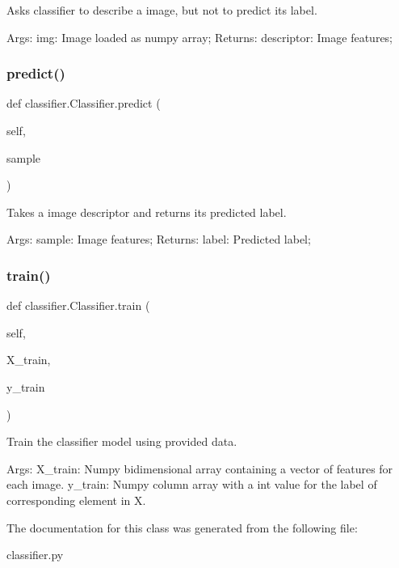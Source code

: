 Asks classifier to describe a image, but not to predict it\textquotesingle{}s label. 

Args\+: img\+: Image loaded as numpy array; Returns\+: descriptor\+: Image features; \mbox{\label{classclassifier_1_1_classifier_aec9c4f80b858660a2ac85226e56670a1}} 
\subsubsection{\texorpdfstring{predict()}{predict()}}
{\footnotesize\ttfamily def classifier.\+Classifier.\+predict (\begin{DoxyParamCaption}\item[{}]{self,  }\item[{}]{sample }\end{DoxyParamCaption})}



Takes a image descriptor and returns it\textquotesingle{}s predicted label. 

Args\+: sample\+: Image features; Returns\+: label\+: Predicted label; \mbox{\label{classclassifier_1_1_classifier_a6113499eedf79694730f3bbb36958aee}} 
\subsubsection{\texorpdfstring{train()}{train()}}
{\footnotesize\ttfamily def classifier.\+Classifier.\+train (\begin{DoxyParamCaption}\item[{}]{self,  }\item[{}]{X\+\_\+train,  }\item[{}]{y\+\_\+train }\end{DoxyParamCaption})}



Train the classifier model using provided data. 

Args\+: X\+\_\+train\+: Numpy bidimensional array containing a vector of features for each image. y\+\_\+train\+: Numpy column array with a int value for the label of corresponding element in X. 

The documentation for this class was generated from the following file\+:\begin{DoxyCompactItemize}
\item 
classifier.\+py\end{DoxyCompactItemize}
